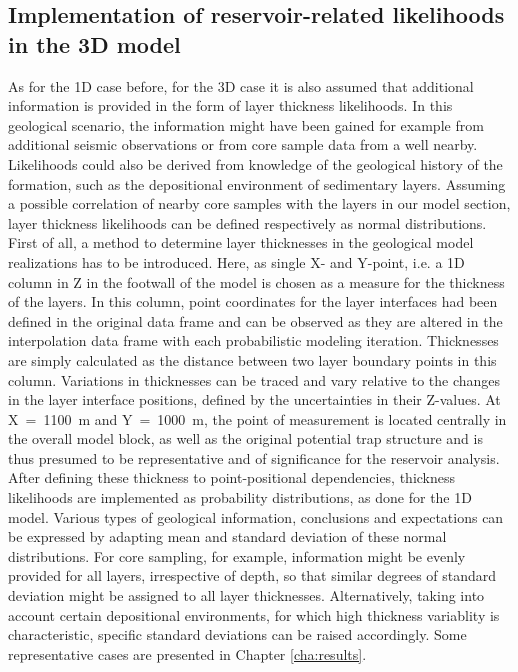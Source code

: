 		\subsection{Implementation of reservoir-related likelihoods in the 3D model}
		As for the 1D case before, for the 3D case it is also assumed that additional information is provided in the form of layer thickness likelihoods. In this geological scenario, the information might have been gained for example from additional seismic observations or from core sample data from a well nearby. Likelihoods could also be derived from knowledge of the geological history of the formation, such as the depositional environment of sedimentary layers. Assuming a possible correlation of nearby core samples with the layers in our model section, layer thickness likelihoods can be defined respectively as normal distributions.\\
		First of all, a method to determine layer thicknesses in the geological model realizations has to be introduced. Here, as single X- and Y-point, i.e. a 1D column in Z in the footwall of the model is chosen as a measure for the thickness of the layers. In this column, point coordinates for the layer interfaces had been defined in the original data frame and can be observed as they are altered in the interpolation data frame with each probabilistic modeling iteration. Thicknesses are simply calculated as the distance between two layer boundary points in this column. Variations in thicknesses can be traced and vary relative to the changes in the layer interface positions, defined by the uncertainties in their Z-values. At X~=~1100~m and Y~=~1000~m, the point of measurement is located centrally in the overall model block, as well as the original potential trap structure and is thus presumed to be representative and of significance for the reservoir analysis.\\
		After defining these thickness to point-positional dependencies, thickness likelihoods are implemented as probability distributions, as done for the 1D model. Various types of geological information, conclusions and expectations can be expressed by adapting mean and standard deviation of these normal distributions. For core sampling, for example, information might be evenly provided for all layers, irrespective of depth, so that similar degrees of standard deviation might be assigned to all layer thicknesses. Alternatively, taking into account certain depositional environments, for which high thickness variablity is characteristic, specific standard deviations can be raised accordingly. Some representative cases are presented in Chapter \ref{cha:results}.
		

